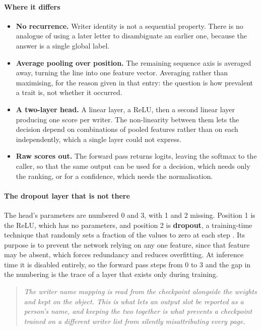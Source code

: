 \paragraph{Where it differs}

\begin{itemize}\setlength\itemsep{0pt}
  \item \textbf{No recurrence.} Writer identity is not a sequential property. There is no analogue of using a later letter to disambiguate an earlier one, because the answer is a single global label.
  \item \textbf{Average pooling over position.} The remaining sequence axis is averaged away, turning the line into one feature vector. Averaging rather than maximising, for the reason given in that entry: the question is how prevalent a trait is, not whether it occurred.
  \item \textbf{A two-layer head.} A linear layer, a ReLU, then a second linear layer producing one score per writer. The non-linearity between them lets the decision depend on combinations of pooled features rather than on each independently, which a single layer could not express.
  \item \textbf{Raw scores out.} The forward pass returns logits, leaving the softmax to the caller, so that the same output can be used for a decision, which needs only the ranking, or for a confidence, which needs the normalisation.
\end{itemize}

\paragraph{The dropout layer that is not there}
The head's parameters are numbered 0 and 3, with 1 and 2 missing. Position 1 is the ReLU, which has no parameters, and position 2 is \textbf{dropout}, a training-time technique that randomly sets a fraction of the values to zero at each step \cite{srivastava2014}. Its purpose is to prevent the network relying on any one feature, since that feature may be absent, which forces redundancy and reduces overfitting. At inference time it is disabled entirely, so the forward pass steps from 0 to 3 and the gap in the numbering is the trace of a layer that exists only during training.


\begin{quote}\small\itshape The writer name mapping is read from the checkpoint alongside the weights and kept on the object. This is what lets an output slot be reported as a person's name, and keeping the two together is what prevents a checkpoint trained on a different writer list from silently misattributing every page.\end{quote}

